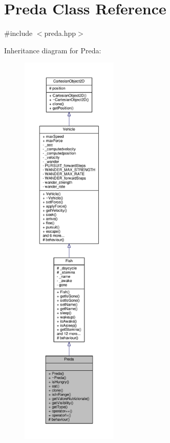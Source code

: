 \hypertarget{classPreda}{}\section{Preda Class Reference}
\label{classPreda}


{\ttfamily \#include $<$preda.\+hpp$>$}



Inheritance diagram for Preda\+:\nopagebreak
\begin{figure}[H]
\begin{center}
\leavevmode
\includegraphics[height=550pt]{classPreda__inherit__graph}
\end{center}
\end{figure}


